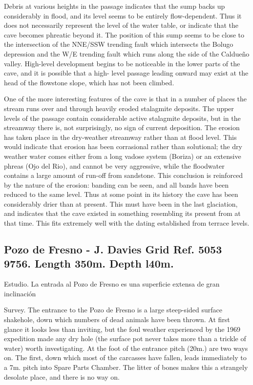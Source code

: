 \documentclass[11pt, a4paper, twoside]{memoir}
\begin{document}
Debris at various heights in the passage indicates that the sump backs up considerably in flood, and its level seems to be entirely flow-dependent. Thus it does not necessarily represent the level of the water table, or indicate that the cave becomes phreatic beyond it. The position of this sump seems to be close to the intersection of the NNE/SSW trending fault which intersects the Bolugo depression and the W/E trending fault which runs along the side of the Caldueño valley. High-level development begins to be noticeable in the lower parts of the cave, and it is possible that a high- level passage leading onward may exist at the head of the flowstone slope, which has not been climbed.

One of the more interesting features of the cave is that in a number of places the stream runs over and through heavily eroded stalagmite deposits. The upper levels of the passage contain considerable active stalagmite deposits, but in the streamway there is, not surprisingly, no sign of current deposition. The erosion has taken place in the dry-weather streamway rather than at flood level. This would indicate that erosion has been corrasional rather than solutional; the dry weather water comes either from a long vadose system (Boriza) or an extensive phreas (Ojo del Rio), and cannot be very aggressive, while the floodwater contains a large amount of run-off from sandstone. This conclusion is reinforced by the nature of the erosion: banding can be seen, and all bands have been reduced to the same level. Thus at some point in its history the cave has been considerably drier than at present. This must have been in the last glaciation, and indicates that the cave existed in something resembling its present from at that time. This fits extremely well with the dating established from terrace levels.




\subsection*{Pozo de Fresno - J. Davies Grid Ref. 5053 9756. Length 350m. Depth l40m.}

Estudio. La entrada al Pozo de Fresno es una superficie extensa de gran inclinación

Survey. The entrance to the Pozo de Fresno is a large steep-sided surface shakehole, down which numbers of dead animals have been thrown. At first glance it looks less than inviting, but the foul weather experienced by the 1969 expedition made any dry hole (the surface pot never takes more than a trickle of water) worth investigating. At the foot of the entrance pitch (20m.) are two ways on. The first, down which most of the carcasses have fallen, leads immediately to a 7m. pitch into Spare Parts Chamber. The litter of bones makes this a strangely desolate place, and there is no way on.
\end{document}
